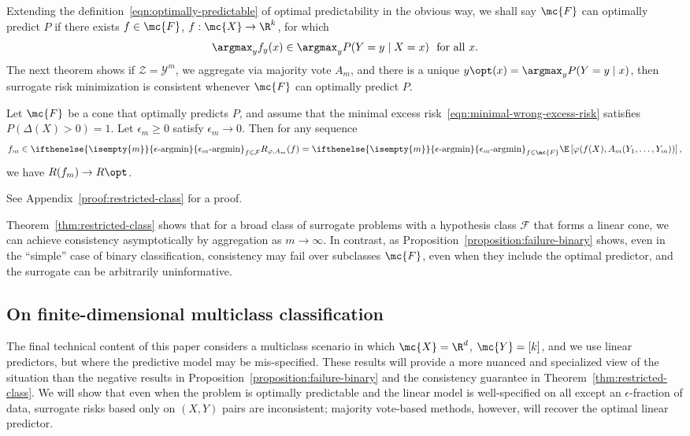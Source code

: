\documentclass[11pt]{article}
\newcommand{\brk}[1]{\left[{#1}\right]} %
\newcommand{\sloss}{\varphi}  %
\newcommand{\epsargmin}[1][]{
  \ifthenelse{\isempty{#1}}{%
    \mathop{\epsilon\textup{-argmin}}
  }{%
    \mathop{\epsilon_{#1}\textup{-argmin}}
  }
}
\begin{document}
Extending the definition~\eqref{eqn:optimally-predictable}
of optimal predictability in the obvious way,
we shall say $\mc{F}$ can optimally predict $P$ if there exists
$f \in \mc{F}$, $f : \mc{X} \to \R^k$, for which
\begin{equation*}
  \argmax_y f_y(x) \in
  \argmax_y P(Y = y \mid X = x)
  ~~ \mbox{for~all~} x.
\end{equation*}
The next theorem shows if $\mathcal{Z} = \mathcal{Y}^m$, we aggregate via
majority vote $A_m$, and there is a unique $y\opt(x) = \argmax_y P(Y=y \mid
x)$, then surrogate risk minimization is consistent whenever $\mc{F}$ can
optimally predict $P$.
\begin{theorem}
  \label{thm:restricted-class}
  Let $\mc{F}$ be a cone that optimally predicts $P$,
  and assume that the
  minimal excess risk~\eqref{eqn:minimal-wrong-excess-risk}
  satisfies $P(\Delta(X) > 0) = 1$.
  Let $\epsilon_m \ge 0$ satisfy $\epsilon_m \to 0$.
  Then for any sequence
  \begin{align*}
    f_m \in \epsargmin[m]_{f \in \mathcal{F}}
    R_{\sloss,A_m}(f) = \epsargmin[m]_{f \in \mc{F}}
    \E\brk{\sloss(f(X), A_m(Y_1, \ldots, Y_m))},
  \end{align*}
  we have $R(f_m) \to R\opt$.
\end{theorem}
\noindent
See Appendix~\ref{proof:restricted-class} for a proof.

Theorem~\ref{thm:restricted-class} shows that for a broad class of surrogate
problems with a hypothesis class $\mathcal{F}$ that forms a linear cone, we
can achieve consistency asymptotically by aggregation as $m \to \infty$.
%
In contrast, as Proposition~\ref{proposition:failure-binary} shows, even in the
``simple'' case of binary classification, consistency may fail over
subclasses $\mc{F}$, even when they include the optimal predictor, and the
surrogate can be arbitrarily uninformative.

\subsection{On finite-dimensional multiclass classification}
\label{sec:finite-dim}

The final technical content of this paper
considers a multiclass scenario in which $\mc{X} = \R^d$, $\mc{Y} = [k]$,
and we use linear predictors,
but where the predictive model may be mis-specified.
%
These results will provide a more nuanced and specialized view
of the situation than the negative results in
Proposition~\ref{proposition:failure-binary} and the consistency guarantee
in Theorem~\ref{thm:restricted-class}.
%
We will show that even when the problem is optimally predictable and the
linear model is well-specified on all except an $\epsilon$-fraction of
data, surrogate risks based only on $(X, Y)$ pairs are inconsistent;
majority vote-based methods, however, will recover the optimal linear
predictor.
\end{document}
